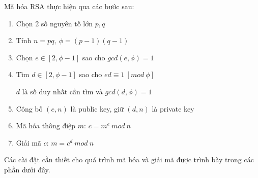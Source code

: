 Mã hóa RSA thực hiện qua các bước sau:

\begin{enumerate}[ \indent{(}1{)} ]
        \item Chọn 2 số nguyên tố lớn $p,q$
        \item Tính $n=pq,\ \phi= (p-1)(q-1)$
        \item Chọn $e\in[2, \phi - 1]$ sao cho $gcd(e, \phi) = 1$
        \item Tìm $d \in [2, \phi - 1]$ sao cho $ed \equiv 1\ [mod\ \phi]$

        $d$ là số duy nhất cần tìm và $gcd(d,\phi)=1$
        \item Công bố $(e, n)$ là public key, giữ $(d, n)$ là private key
        \item Mã hóa thông điệp $m$: $c = m^e\ mod\ n$
        \item Giải mã $c$: $m = c^d\ mod\ n$
\end{enumerate}
Các cài đặt cần thiết cho quá trình mã hóa và giải mã được trình bày trong các phần dưới đây.